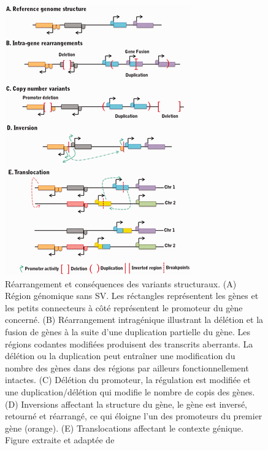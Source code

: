 \begin{figure}[htbp]
    \centering
    \includegraphics[width=\textwidth,height=0.45\textheight,keepaspectratio]{images/rearrangement.png}
    \caption[Réarrangement et implication]{Réarrangement et conséquences des variants structuraux. (A) Région génomique sans SV. Les réctangles représentent les gènes et les petits connecteurs à côté représentent le promoteur du gène concerné. (B) Réarrangement intragénique illustrant la délétion et la fusion de gènes à la suite d'une duplication partielle du gène. Les régions codantes modifiées produisent des transcrits aberrants. La délétion ou la duplication peut entraîner une modification du nombre des gènes dans des régions par ailleurs fonctionnellement intactes. (C) Délétion du promoteur, la régulation est modifiée et une duplication/délétion qui modifie le nombre de copis des gènes. (D) Inversions affectant la structure du gène, le gène est inversé, retourné et réarrangé, ce qui éloigne l'un des promoteurs du premier gène (orange). (E) Translocations affectant le contexte génique. Figure extraite et adaptée de \cite{periwal_insights_2015}}
    \label{fig:rearrangement}
\end{figure}

